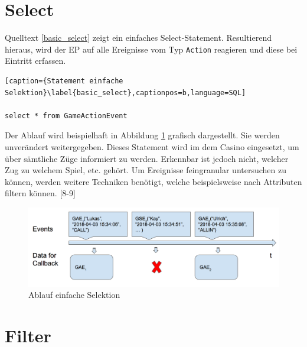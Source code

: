 \section{Select}

Quelltext \ref{basic_select} zeigt ein einfaches Select-Statement. Resultierend hieraus, wird der \acf{EP} auf alle Ereignisse vom Typ \texttt{Action} reagieren und diese bei Eintritt erfassen. 
\begin{lstlisting}[caption={Statement einfache Selektion}\label{basic_select},captionpos=b,language=SQL]

select * from GameActionEvent

\end{lstlisting}
Der Ablauf wird beispielhaft in Abbildung \ref{basic_select_img} grafisch dargestellt. Sie werden unverändert weitergegeben. Dieses Statement wird im dem Casino eingesetzt, um über sämtliche Züge informiert zu werden. Erkennbar ist jedoch nicht, welcher Zug zu welchem Spiel, etc. gehört. Um Ereignisse feingranular untersuchen zu können, werden weitere Techniken benötigt, welche beispielsweise nach Attributen filtern können.
\cite{EsperRef2018}[8-9]

\begin{figure}[h]
	\centering
	\includegraphics[width=\textwidth,height=\textheight, keepaspectratio]{images/statement_basic_select.png}
	\caption{Ablauf einfache Selektion}
	\label{basic_select_img}
\end{figure}

\section{Filter}

